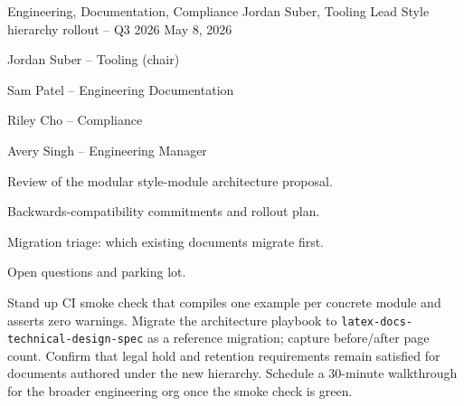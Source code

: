 \documentclass[11pt]{article}
\begin{document}
\makedoctitle

\memoheader
  {Engineering, Documentation, Compliance}
  {Jordan Suber, Tooling Lead}
  {Style hierarchy rollout -- Q3 2026}
  {May 8, 2026}

\begin{attendees}
  \item Jordan Suber -- Tooling (chair)
  \item Sam Patel -- Engineering Documentation
  \item Riley Cho -- Compliance
  \item Avery Singh -- Engineering Manager
\end{attendees}

\begin{agenda}
  \item Review of the modular style-module architecture proposal.
  \item Backwards-compatibility commitments and rollout plan.
  \item Migration triage: which existing documents migrate first.
  \item Open questions and parking lot.
\end{agenda}

\begin{decisions}
\end{decisions}

\begin{actionitems}
             {Stand up CI smoke check that compiles one example per concrete
              module and asserts zero warnings.}
             {Migrate the architecture playbook to
              \texttt{latex-docs-technical-design-spec} as a reference
              migration; capture before/after page count.}
             {Confirm that legal hold and retention requirements remain
              satisfied for documents authored under the new hierarchy.}
             {Schedule a 30-minute walkthrough for the broader
              engineering org once the smoke check is green.}
\end{actionitems}
\end{document}
